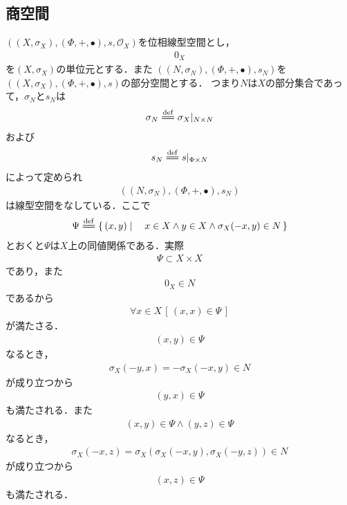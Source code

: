 \subsection{商空間}
	$\left((X,\sigma_X),(\Phi,+,\bullet),s,\mathscr{O}_X\right)$を位相線型空間とし，
	\begin{align}
		0_X
	\end{align}
	を$(X,\sigma_X)$の単位元とする．また
	$\left((N,\sigma_N),(\Phi,+,\bullet),s_N\right)$を$\left((X,\sigma_X),(\Phi,+,\bullet),s\right)$の部分空間とする．
	つまり$N$は$X$の部分集合であって，$\sigma_N$と$s_N$は
	\begin{align}
		\sigma_N \defeq \sigma_X|_{N \times N}
	\end{align}
	および
	\begin{align}
		s_N \defeq s|_{\Phi \times N}
	\end{align}
	によって定められ
	\begin{align}
		\left((N,\sigma_N),(\Phi,+,\bullet),s_N\right)
	\end{align}
	は線型空間をなしている．ここで
	\begin{align}
		\Psi \defeq \Set{(x,y)}{x \in X \wedge y \in X \wedge \sigma_X(-x,y) \in N}
	\end{align}
	とおくと$\Psi$は$X$上の同値関係である．実際
	\begin{align}
		\Psi \subset X \times X
	\end{align}
	であり，また
	\begin{align}
		0_X \in N
	\end{align}
	であるから
	\begin{align}
		\forall x \in X\, \left[\, (x,x) \in \Psi\, \right]
	\end{align}
	が満たさる．
	\begin{align}
		(x,y) \in \Psi
	\end{align}
	なるとき，
	\begin{align}
		\sigma_X(-y,x) = -\sigma_X(-x,y) \in N
	\end{align}
	が成り立つから
	\begin{align}
		(y,x) \in \Psi
	\end{align}
	も満たされる．また
	\begin{align}
		(x,y) \in \Psi \wedge (y,z) \in \Psi
	\end{align}
	なるとき，
	\begin{align}
		\sigma_X(-x,z) = \sigma_X\left(\sigma_X(-x,y),\sigma_X(-y,z)\right) \in N
	\end{align}
	が成り立つから
	\begin{align}
		(x,z) \in \Psi
	\end{align}
	も満たされる．
	
	